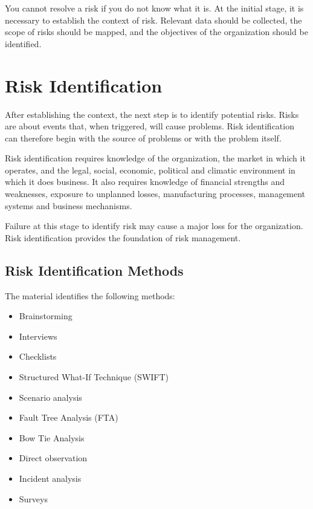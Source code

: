 \documentclass[
]{book}
\providecommand{\tightlist}{%
  \setlength{\itemsep}{0pt}\setlength{\parskip}{0pt}}
\begin{document}
You cannot resolve a risk if you do not know what it is. At the initial stage, it is necessary to establish the context of risk. Relevant data should be collected, the scope of risks should be mapped, and the objectives of the organization should be identified.

\section{Risk Identification}\label{risk-identification}

After establishing the context, the next step is to identify potential risks. Risks are about events that, when triggered, will cause problems. Risk identification can therefore begin with the source of problems or with the problem itself.

Risk identification requires knowledge of the organization, the market in which it operates, and the legal, social, economic, political and climatic environment in which it does business. It also requires knowledge of financial strengths and weaknesses, exposure to unplanned losses, manufacturing processes, management systems and business mechanisms.

Failure at this stage to identify risk may cause a major loss for the organization. Risk identification provides the foundation of risk management.

\subsection{Risk Identification Methods}\label{risk-identification-methods}

The material identifies the following methods:

\begin{itemize}
\tightlist
\item
  Brainstorming
\item
  Interviews
\item
  Checklists
\item
  Structured What-If Technique (SWIFT)
\item
  Scenario analysis
\item
  Fault Tree Analysis (FTA)
\item
  Bow Tie Analysis
\item
  Direct observation
\item
  Incident analysis
\item
  Surveys
\end{itemize}
\end{document}
